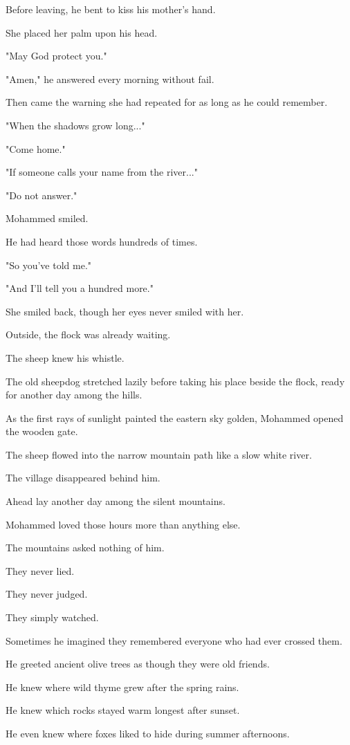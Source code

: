 \documentclass[12pt,openany]{book}
\begin{document}
Before leaving, he bent to kiss his mother's hand.

She placed her palm upon his head.

"May God protect you."

"Amen," he answered every morning without fail.

Then came the warning she had repeated for as long as he could remember.

"When the shadows grow long..."

"Come home."

"If someone calls your name from the river..."

"Do not answer."

Mohammed smiled.

He had heard those words hundreds of times.

"So you've told me."

"And I'll tell you a hundred more."

She smiled back, though her eyes never smiled with her.

Outside, the flock was already waiting.

The sheep knew his whistle.

The old sheepdog stretched lazily before taking his place beside the flock, ready for another day among the hills.

As the first rays of sunlight painted the eastern sky golden, Mohammed opened the wooden gate.

The sheep flowed into the narrow mountain path like a slow white river.

The village disappeared behind him.

Ahead lay another day among the silent mountains.

Mohammed loved those hours more than anything else.

The mountains asked nothing of him.

They never lied.

They never judged.

They simply watched.

Sometimes he imagined they remembered everyone who had ever crossed them.

He greeted ancient olive trees as though they were old friends.

He knew where wild thyme grew after the spring rains.

He knew which rocks stayed warm longest after sunset.

He even knew where foxes liked to hide during summer afternoons.
\end{document}
